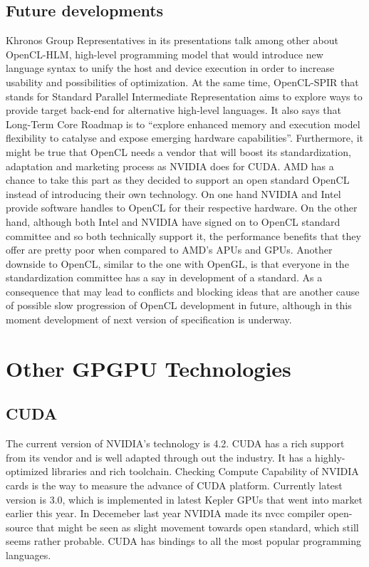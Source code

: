 \subsection{Future developments}
Khronos Group Representatives in its presentations talk among other about OpenCL-HLM, high-level programming model that would introduce new language syntax to unify the host and device execution in order to increase usability and possibilities of optimization. At the same time, OpenCL-SPIR that stands for Standard Parallel Intermediate Representation aims to explore ways to provide target back-end for alternative high-level languages. It also says that Long-Term Core Roadmap is to \enquote{explore enhanced memory and execution model flexibility to catalyse and expose emerging hardware capabilities}.\cite{khronos2012cloverview} Furthermore, it might be true that OpenCL needs a vendor that will boost its standardization, adaptation and marketing process as NVIDIA does for CUDA. AMD has a chance to take this part as they decided to support an open standard OpenCL instead of introducing their own technology. On one hand NVIDIA and Intel provide software handles to OpenCL for their respective hardware. On the other hand, although both Intel and NVIDIA have signed on to OpenCL standard committee and so both technically support it, the performance benefits that they offer are pretty poor when compared to AMD's APUs and GPUs. Another downside to OpenCL, similar to the one with OpenGL, is that everyone in the standardization committee has a say in development of a standard. As a consequence that may lead to conflicts and blocking ideas that are another cause of possible slow progression of OpenCL development in future, although in this moment development of next version of specification is underway.\cite{amd2012hipeac}

\section{Other GPGPU Technologies}
\subsection{CUDA}
The current version of NVIDIA's technology is 4.2. CUDA has a rich support from its vendor and is well adapted through out the industry. It has a highly-optimized libraries and rich toolchain. Checking Compute Capability of NVIDIA cards is the way to measure the advance of CUDA platform. Currently latest version is 3.0, which is implemented in latest Kepler GPUs that went into market earlier this year. In Decemeber last year NVIDIA made its nvcc compiler open-source that might be seen as slight movement towards open standard, which still seems rather probable.\cite{hpcwire2012nvidia} CUDA has bindings to all the most popular programming languages.

